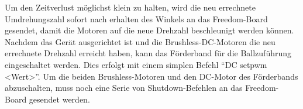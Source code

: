 Um den Zeitverlust möglichst klein zu halten, wird die neu errechnete Umdrehungszahl sofort nach erhalten des Winkels an das 
Freedom-Board gesendet, damit die Motoren auf die neue Drehzahl beschleunigt werden können.
Nachdem das Gerät ausgerichtet ist und die Brushless-DC-Motoren die neu errechnete Drehzahl erreicht haben, kann das Förderband 
für die Ballzuführung eingeschaltet werden. Dies erfolgt mit einem simplen Befehl \enquote{DC setpwm <Wert>}. 
Um die beiden Brushless-Motoren und den DC-Motor des Förderbands abzuschalten, muss noch eine Serie von Shutdown-Befehlen an das 
Freedom-Board gesendet werden. 


            
            
